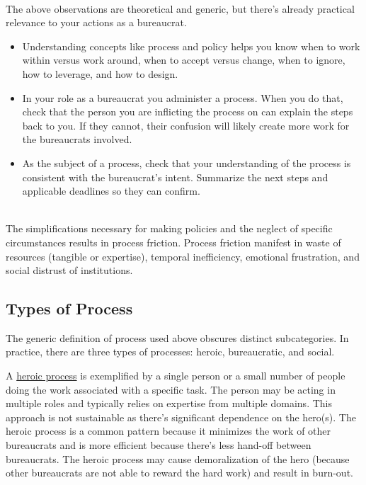 \ \\

The above observations are theoretical and generic, but there's already practical relevance to your actions as a bureaucrat.
\begin{itemize}
    \item Understanding concepts like process and policy helps you know when to work within versus work around, when to accept versus change, when to ignore, how to leverage, and how to design.
    \item In your role as a bureaucrat you administer a process. When you do that, check that the person you are inflicting the process on can explain the steps back to you. If they cannot, their confusion will likely create more work for the bureaucrats involved. 
    \item As the subject of a process, check that your understanding of the process is consistent with the bureaucrat's intent. Summarize the next steps and applicable deadlines so they can confirm. 
\end{itemize}

\ \\

The simplifications necessary for making policies and the neglect of specific circumstances results in \gls{process friction}. Process friction manifest in waste of resources (tangible or expertise), temporal inefficiency, emotional frustration, and social distrust of institutions.



\subsection*{Types of Process}
The generic definition of \gls{process} used above obscures distinct subcategories. In practice, there are three types of processes: heroic, bureaucratic, and social.

A \underline{heroic process} is exemplified by a single person or a small number of people doing the work associated with a specific task. The person may be acting in multiple roles and typically relies on expertise from multiple domains. This approach is not sustainable as there's significant dependence on the hero(s). The heroic process is a common pattern because it minimizes the work of other bureaucrats and is more efficient because there's less hand-off between bureaucrats. The heroic process may cause demoralization of the hero (because other bureaucrats are not able to reward the hard work) and result in burn-out. 

